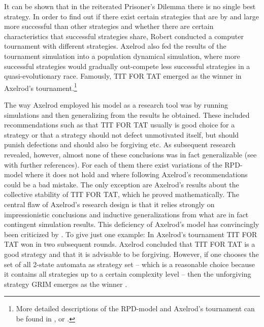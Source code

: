 \documentclass[graybox, English]{svmult}
\begin{document}
It can be shown that in the reiterated Prisoner's Dilemma there is no
single best strategy. In order to find out if there exist certain
strategies that are by and large more successful than other strategies
and whether there are certain characteristics that successful
strategies share, Robert \citet{axelrod:1984} conducted a computer
tournament with different strategies. Axelrod also fed the results of
the tournament simulation into a population dynamical simulation,
where more successful strategies would gradually out-compete less
successful strategies in a quasi-evolutionary race. Famously, TIT FOR
TAT emerged as the winner in Axelrod's tournament.\footnote{More
  detailed descriptions of the RPD-model and Axelrod's tournament can
  be found in \citet{axelrod:1984}, \citet{binmore:1994, binmore:1998}
  or \citet{arnold:2008}.}

The way Axelrod employed his model as a research tool was by running
simulations and then generalizing from the results he obtained. These
included recommendations such as that TIT FOR TAT usually is good
choice for a strategy or that a strategy should not defect unmotivated
itself, but should punish defections and should also be forgiving
etc. As subsequent research revealed, however, almost none of these
conclusions was in fact generalizable (see \citet[106ff.,
126f.]{arnold:2013b} with further references). For each of them there
exist variations of the RPD-model where it does not hold and where
following Axelrod's recommendations could be a bad mistake. The only
exception are Axelrod's results about the collective stability of TIT
FOR TAT, which he proved mathematically. The central flaw of Axelrod's
research design is that it relies strongly on impressionistic
conclusions and inductive generalizations from what are in fact
contingent simulation results. This deficiency of Axelrod's model has
convincingly been criticized by \citet[313ff.]{binmore:1998}. To give
just one example: In Axelrod's tournament TIT FOR TAT won in two
subsequent rounds. Axelrod concluded that TIT FOR TAT is a good
strategy and that it is advisable to be forgiving. However, if one
chooses the set of all 2-state automata as strategy set -- which is a
reasonable choice because it contains all strategies up to a certain
complexity level -- then the unforgiving strategy GRIM emerges as the
winner \citep[295ff.]{binmore:1994}.
\end{document}
